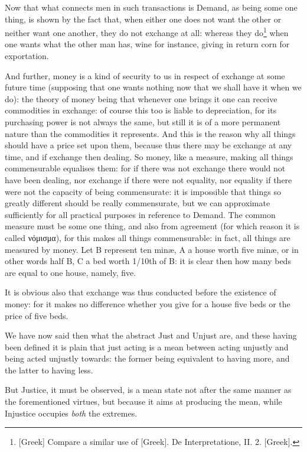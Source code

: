 Now that what connects men in such transactions is Demand, as being some one
thing, is shown by the fact that, when either one does not want the other or
neither want one another, they do not exchange at all: whereas they do\footnote{[Greek] Compare a similar use of [Greek]. De Interpretatione, II. 2. [Greek].}
when one wants what the other man has, wine for instance, giving in return corn
for exportation.

And further, money is a kind of security to us in respect of exchange at some
future time (supposing that one wants nothing now that we shall have it when we
do): the theory of money being that whenever one brings it one can receive
commodities in exchange: of course this too is liable to depreciation, for its
purchasing power is not always the same, but still it is of a more permanent
nature than the commodities it represents. And this is the reason why all
things should have a price set upon them, because thus there may be exchange at
any time, and if exchange then dealing. So money, like a measure, making all
things commensurable equalises them: for if there was not exchange there would
not have been dealing, nor exchange if there were not equality, nor equality if
there were not the capacity of being commensurate: it is impossible that things
so greatly different should be really commensurate, but we can approximate
sufficiently for all practical purposes in reference to Demand. The common
measure must be some one thing, and also from agreement (for which reason it is
called νόμισμα), for this makes all things
commensurable: in fact, all things are measured by money. Let B represent ten
minæ, A a house worth five minæ, or in other words half B, C a bed worth 1/10th
of B: it is clear then how many beds are equal to one house, namely, five.

It is obvious also that exchange was thus conducted before the existence of
money: for it makes no difference whether you give for a house five beds or the
price of five beds.


We have now said then what the abstract Just and Unjust are, and these having
been defined it is plain that just acting is a mean between acting unjustly and
being acted unjustly towards: the former being equivalent to having more, and
the latter to having less.

But Justice, it must be observed, is a mean state not after the same manner as
the forementioned virtues, but because it aims at producing the mean, while
Injustice occupies \emph{both} the extremes.

